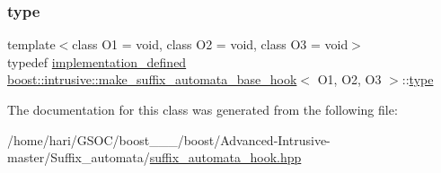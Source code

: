 \subsubsection{\texorpdfstring{type}{type}}
{\footnotesize\ttfamily template$<$class O1 = void, class O2 = void, class O3 = void$>$ \\
typedef \hyperlink{classboost_1_1intrusive_1_1make__suffix__automata__base__hook_a8b3a0f3343ae07dbe98811acc5c67d10}{implementation\+\_\+defined} \hyperlink{classboost_1_1intrusive_1_1make__suffix__automata__base__hook}{boost\+::intrusive\+::make\+\_\+suffix\+\_\+automata\+\_\+base\+\_\+hook}$<$ O1, O2, O3 $>$\+::\hyperlink{classboost_1_1intrusive_1_1make__suffix__automata__base__hook_a3fbc0981de4bc6f6e162259d87cfa3aa}{type}}



The documentation for this class was generated from the following file\+:\begin{DoxyCompactItemize}
\item 
/home/hari/\+G\+S\+O\+C/boost\+\_\+\_\+\_/boost/\+Advanced-\/\+Intrusive-\/master/\+Suffix\+\_\+automata/\hyperlink{suffix__automata__hook_8hpp}{suffix\+\_\+automata\+\_\+hook.\+hpp}\end{DoxyCompactItemize}
